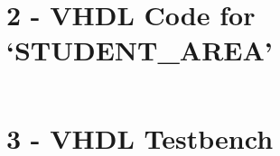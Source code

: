 \documentclass[11pt]{report}
\begin{document}
\section*{2 - VHDL Code for `STUDENT\_AREA'}
\inputminted{vhdl}{../../../DE_Project_T1/DE_Project_T1.srcs/sources_1/imports/DigEng_Proj_T1_model/STUDENT_AREA.vhd}

\section*{3 - VHDL Testbench}
\inputminted{vhdl}{../../../DE_Project_T1/DE_Project_T1.srcs/sim_1/imports/DigEng_Proj_T1_model/TOP_LEVEL_tb.vhd}
\end{document}
